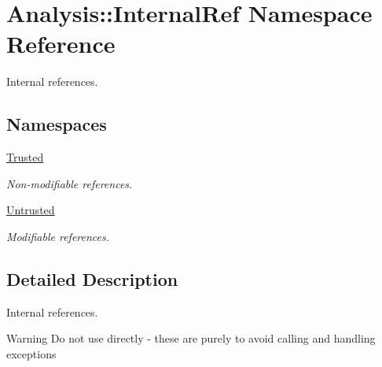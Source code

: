 \hypertarget{namespaceAnalysis_1_1InternalRef}{}\section{Analysis\+:\+:Internal\+Ref Namespace Reference}
\label{namespaceAnalysis_1_1InternalRef}


Internal references.  


\subsection*{Namespaces}
\begin{DoxyCompactItemize}
\item 
 \hyperlink{namespaceAnalysis_1_1InternalRef_1_1Trusted}{Trusted}
\begin{DoxyCompactList}\small\item\em Non-\/modifiable references. \end{DoxyCompactList}\item 
 \hyperlink{namespaceAnalysis_1_1InternalRef_1_1Untrusted}{Untrusted}
\begin{DoxyCompactList}\small\item\em Modifiable references. \end{DoxyCompactList}\end{DoxyCompactItemize}


\subsection{Detailed Description}
Internal references. 

\begin{DoxyWarning}{Warning}
Do not use directly -\/ these are purely to avoid calling and handling exceptions 
\end{DoxyWarning}
